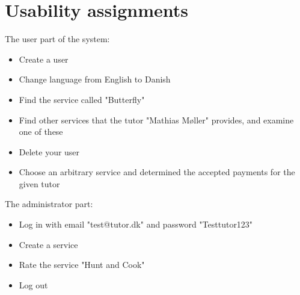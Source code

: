 \section{Usability assignments}\label{app:usability}
The user part of the system:
\begin{itemize}
    \item Create a user
    \item Change language from English to Danish
    \item Find the service called "Butterfly"
    \item Find other services that the tutor "Mathias Møller" provides, and examine one of these
    \item Delete your user
    \item Choose an arbitrary service and determined the accepted payments for the given tutor
\end{itemize}

The administrator part:
\begin{itemize}
    \item Log in with email "test@tutor.dk" and password "Testtutor123"
    \item Create a service
    \item Rate the service "Hunt and Cook"
    \item Log out
\end{itemize}

